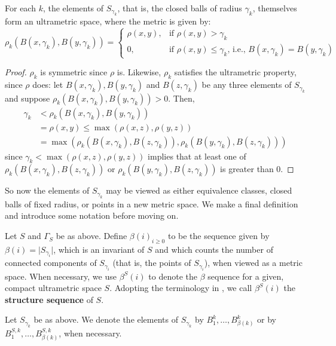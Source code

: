 \begin{lemma}
For each $k$, the elements of $S_{\gamma_k}$, that is, the closed balls of radius $\gamma_k$, themselves form an ultrametric space, where the metric is given by:
\[ \rho_k(B(x, \gamma_k),B(y, \gamma_k)) = 
\begin{cases}
\rho(x,y), & \text{if } \rho(x,y) > \gamma_k \\
0, & \text{if }   \rho(x,y) \leq \gamma_k \text{, i.e., } B(x, \gamma_k)=B(y, \gamma_k)
\end{cases}
\]
\end{lemma}

\begin{proof}
$\rho_k$ is symmetric since $\rho$ is. Likewise, $\rho_k$ satisfies the ultrametric property, since $\rho$ does: let $B(x, \gamma_k),B(y, \gamma_k)$ and $B(z, \gamma_k)$ be any three elements of $S_{\gamma_k}$ and suppose $\rho_k(B(x, \gamma_k),B(y, \gamma_k)) > 0 $. Then,
\begin{align*}
\gamma_k  &< \rho_k(B(x, \gamma_k),B(y, \gamma_k))  \\
&= \rho(x,y) \leq \max(\rho(x,z), \rho(y,z)) \\
&= \max(\rho_k(B(x, \gamma_k), B(z, \gamma_k)), \rho_k(B(y, \gamma_k),B(z,\gamma_k)))
\end{align*}
since $ \gamma_k < \max(\rho(x,z), \rho(y,z))$ implies that at least one of $\rho_k(B(x, \gamma_k), B(z, \gamma_k))$ or $\rho_k(B(y, \gamma_k),B(z,\gamma_k))$ is greater than $0$.
\end{proof}

So now the elements of $S_{\gamma_k}$ may be viewed as either equivalence classes, closed balls of fixed radius, or points in a new metric space. We  make a final definition and introduce some notation before moving on.\\

\begin{definition}
Let $S$ and $\Gamma_S$ be as above. Define $\beta(i)_{i \geq 0}$ to be the sequence given by $\beta(i) = \lvert  S_{\gamma_i}\rvert$, which is an invariant of $S$ and which counts the number of connected components of $S_{\gamma_i}$ (that is, the points of $S_{\gamma_i}$), when viewed as a metric space. When necessary, we use $\beta^S(i)$ to denote the $\beta$ sequence for a given, compact  ultrametric space $S$. Adopting the terminology in \cite{fp}, we call $\beta^S(i)$ the \textbf{structure sequence} of $S$.
\end{definition}

\begin{notation}
Let $S_{\gamma_k}$ be as above. We denote the elements of $S_{\gamma_k}$ by $B^k_1, \ldots, B^k_{\beta(k)}$ or by $B^{S,k}_1, \ldots, B^{S,k}_{\beta(k)}$, when necessary.
\end{notation}


